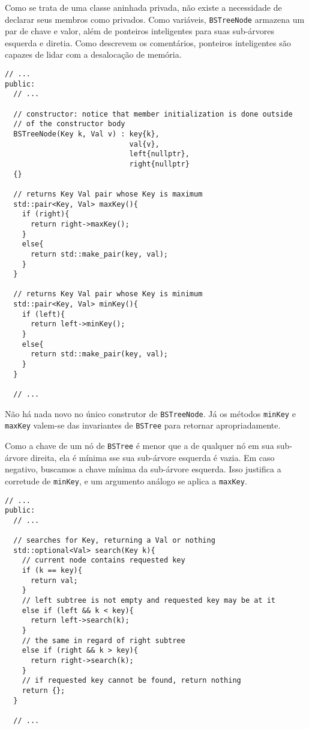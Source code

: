 \documentclass[11pt]{article}
\begin{document}
Como se trata de uma classe aninhada privada, não existe a
necessidade de declarar seus membros como privados.  Como
variáveis, \texttt{BSTreeNode} armazena um par de chave e valor, além de
ponteiros inteligentes para suas sub-árvores esquerda e diretia.
Como descrevem os comentários, ponteiros inteligentes são capazes
de lidar com a desalocação de memória.

\pagebreak

\begin{verbatim}
// ...
public:
  // ...

  // constructor: notice that member initialization is done outside
  // of the constructor body
  BSTreeNode(Key k, Val v) : key{k},
                             val{v},
                             left{nullptr},
                             right{nullptr}
  {}

  // returns Key Val pair whose Key is maximum
  std::pair<Key, Val> maxKey(){
    if (right){
      return right->maxKey();
    }
    else{
      return std::make_pair(key, val);
    }
  }

  // returns Key Val pair whose Key is minimum
  std::pair<Key, Val> minKey(){
    if (left){
      return left->minKey();
    }
    else{
      return std::make_pair(key, val);
    }
  }

  // ...
\end{verbatim}

Não há nada novo no único construtor de \texttt{BSTreeNode}.  Já os
métodos \texttt{minKey} e \texttt{maxKey} valem-se das invariantes de \texttt{BSTree}
para retornar apropriadamente.

Como a chave de um nó de \texttt{BSTree} é menor que a de qualquer nó em
sua sub-árvore direita, ela é mínima sse sua sub-árvore esquerda é
vazia.  Em caso negativo, buscamos a chave mínima da sub-árvore
esquerda.  Isso justifica a corretude de \texttt{minKey}, e um argumento
análogo se aplica a \texttt{maxKey}.

\pagebreak

\begin{verbatim}
// ...
public:
  // ...

  // searches for Key, returning a Val or nothing
  std::optional<Val> search(Key k){
    // current node contains requested key
    if (k == key){
      return val;
    }
    // left subtree is not empty and requested key may be at it
    else if (left && k < key){
      return left->search(k);
    }
    // the same in regard of right subtree
    else if (right && k > key){
      return right->search(k);
    }
    // if requested key cannot be found, return nothing
    return {};
  }

  // ...
\end{verbatim}
\end{document}
